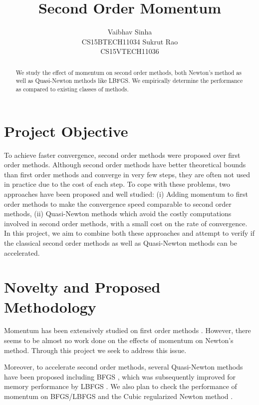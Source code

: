\documentclass{article}
\title{Second Order Momentum}
\author{
  Vaibhav Sinha \\
  CS15BTECH11034
  \And
  Sukrut Rao \\
  CS15VTECH11036
}
\begin{document}
\maketitle

\begin{abstract}
  We study the effect of momentum on second order methods, both Newton's method as well as Quasi-Newton methods like LBFGS. We empirically determine the performance as compared to existing classes of methods.
\end{abstract}

\section{Project Objective}

To achieve faster convergence, second order methods were proposed over first order methods. Although second order methods have better theoretical bounds than first order methods and converge in very few steps, they are often not used in practice due to the cost of each step. To cope with these problems, two approaches have been proposed and well studied: (i) Adding momentum \cite{POLYAK19641,Sutskever} to first order methods to make the convergence speed comparable to second order methods, (ii) Quasi-Newton methods \citep{davidon,broyden1965class,nocedal1980updating} which avoid the costly computations involved in second order methods, with a small cost on the rate of convergence. In this project, we aim to combine both these approaches and attempt to verify if the classical second order methods as well as Quasi-Newton methods can be accelerated.

\section{Novelty and Proposed Methodology}

Momentum has been extensively studied on first order methods \citep{POLYAK19641,Sutskever}. However, there seems to be almost no work done on the effects of momentum on Newton’s method. Through this project we seek to address this issue.

Moreover, to accelerate second order methods, several Quasi-Newton methods have been proposed including BFGS \citep{broyden1965class}, which was subsequently improved for memory performance by LBFGS \citep{nocedal1980updating}. We also plan to check the performance of momentum on BFGS/LBFGS and the Cubic regularized Newton method \citep{nesterov2006cubic}.
\end{document}

